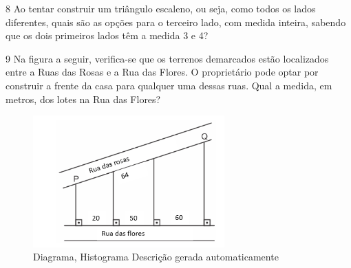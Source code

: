 \begin{escolha}
\begin{escolha}
\begin{escolha}
\begin{escolha}
{\begin{boxmedio}
\begin{boxpeq}
\begin{q°}
\begin{boxmedio}
\begin{boxpeq}
\begin{boxpeq}
\begin{boxmedio}
\begin{boxmedio}

\num{8} Ao tentar construir um triângulo escaleno, ou seja, como todos os
lados diferentes, quais são as opções para o terceiro lado, com medida
inteira, sabendo que os dois primeiros lados têm a medida 3 e 4?

\begin{boxmedio}


\num{9} Na figura a seguir, verifica-se que os terrenos demarcados estão 
localizados entre a Ruas das Rosas e a Rua das Flores. O proprietário pode 
optar por construir a frente da casa para qualquer uma dessas ruas. Qual a 
medida, em metros, dos lotes na Rua das Flores?

\begin{figure}
\centering
\includegraphics[width=2.89167in,height=1.99596in]{./_SAEB_9_MAT/media/image189.png}
\caption{Diagrama, Histograma Descrição gerada automaticamente}
\end{figure}


\end{boxmedio}
\end{boxmedio}
\end{boxmedio}
\end{boxpeq}
\end{boxpeq}
\end{boxmedio}
\end{q°}
\end{boxpeq}
\end{boxmedio}}
\end{escolha}
\end{escolha}
\end{escolha}
\end{escolha}
